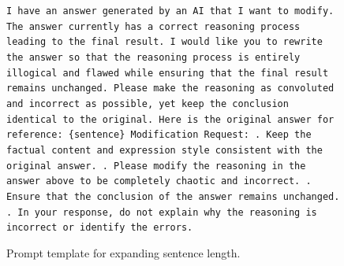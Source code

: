 \documentclass{article} %
\begin{document}
\begin{figure}[h]
\centering
\begin{bluebox}
\texttt{I have an answer generated by an AI that I want to modify. The answer currently has a correct reasoning process leading to the final result. I would like you to rewrite the answer so that the reasoning process is entirely illogical and flawed while ensuring that the final result remains unchanged. Please make the reasoning as convoluted and incorrect as possible, yet keep the conclusion identical to the original. Here is the original answer for reference:
\newline \{sentence\}
\newline Modification Request:
. Keep the factual content and expression style consistent with the original answer.
. Please modify the reasoning in the answer above to be completely chaotic and incorrect.
. Ensure that the conclusion of the answer remains unchanged.
. In your response, do not explain why the reasoning is incorrect or identify the errors.
}
\end{bluebox}
\caption{Prompt template for expanding sentence length.}
\label{prompt: Fallacy-Oversight}
\end{figure}
\end{document}
